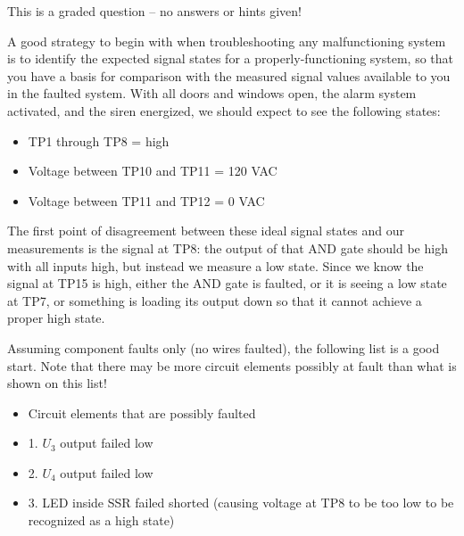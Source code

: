 \vfil 

\eject






This is a graded question -- no answers or hints given!







A good strategy to begin with when troubleshooting any malfunctioning system is to identify the expected signal states for a properly-functioning system, so that you have a basis for comparison with the measured signal values available to you in the faulted system.  With all doors and windows open, the alarm system activated, and the siren energized, we should expect to see the following states:

\begin{itemize}
\item{} TP1 through TP8 = high
\item{} Voltage between TP10 and TP11 = 120 VAC
\item{} Voltage between TP11 and TP12 = 0 VAC
\end{itemize}

The first point of disagreement between these ideal signal states and our measurements is the signal at TP8: the output of that AND gate should be high with all inputs high, but instead we measure a low state.  Since we know the signal at TP15 is high, either the AND gate is faulted, or it is seeing a low state at TP7, or something is loading its output down so that it cannot achieve a proper high state.

\vskip 10pt

Assuming component faults only (no wires faulted), the following list is a good start.  Note that there may be more circuit elements possibly at fault than what is shown on this list!

\begin{itemize}
\item{} Circuit elements that are possibly faulted
\item{1.} $U_3$ output failed low
\item{2.} $U_4$ output failed low
\item{3.} LED inside SSR failed shorted (causing voltage at TP8 to be too low to be recognized as a high state)
\end{itemize}




